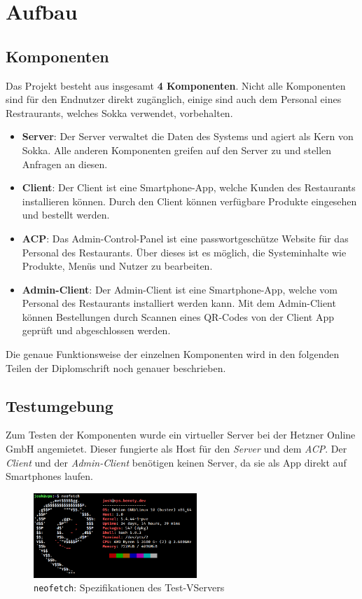 \chapter{Aufbau}

\section{Komponenten}

Das Projekt besteht aus insgesamt \textbf{4 Komponenten}. Nicht alle Komponenten sind für den Endnutzer direkt zugänglich, einige sind auch dem Personal eines Restraurants, welches Sokka verwendet, vorbehalten.

\begin{itemize}
    \item \textbf{Server}: Der Server verwaltet die Daten des Systems und agiert als Kern von Sokka. Alle anderen Komponenten greifen auf den Server zu und stellen Anfragen an diesen.
    \item \textbf{Client}: Der Client ist eine Smartphone-App, welche Kunden des Restaurants installieren können. Durch den Client können verfügbare Produkte eingesehen und bestellt werden.
    \item \textbf{ACP}: Das Admin-Control-Panel ist eine passwortgeschütze Website für das Personal des Restaurants. Über dieses ist es möglich, die Systeminhalte wie Produkte, Menüs und Nutzer zu bearbeiten.
    \item \textbf{Admin-Client}: Der Admin-Client ist eine Smartphone-App, welche vom Personal des Restaurants installiert werden kann. Mit dem Admin-Client können Bestellungen durch Scannen eines QR-Codes von der Client App geprüft und abgeschlossen werden.
\end{itemize}

Die genaue Funktionsweise der einzelnen Komponenten wird in den folgenden Teilen der Diplomschrift noch genauer beschrieben.

\section{Testumgebung}

Zum Testen der Komponenten wurde ein virtueller Server bei der Hetzner Online GmbH angemietet. Dieser fungierte als Host für den \textit{Server} und dem \textit{ACP}. Der \textit{Client} und der \textit{Admin-Client} benötigen keinen Server, da sie als App direkt auf Smartphones laufen.

\begin{figure}[ht]
    \centering
    \includegraphics[width=0.55\textwidth]{images/Intro/specs.png}
    \caption{\lstinline{neofetch}: Spezifikationen des Test-VServers}
\end{figure}

